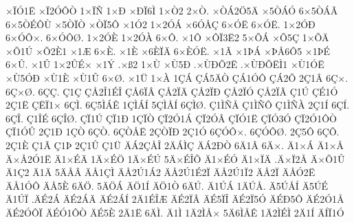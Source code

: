 {^^d7^^cf^^d31^^cb
^^d7^^cf2^^d3^^d4^^d2
1^^d7^^cf^^d1
1^^d7^^d0
^^d7^^d0^^cf6^^cc
1^^d7^^d22
2^^d7^^d2.
^^d7^^d2^^c12^^d65^^c4
^^d75^^d2^^c1^^d3
6^^d75^^d2^^c1^^c3
6^^d75^^d2^^c9^^d4^^d9
^^d75^^d2^^cf^^d2
^^d7^^d2^^cf5^^d4
^^d71^^d32
1^^d72^^d3^^c1
^^d76^^d3^^c5^^c7
6^^d7^^d3^^cb
6^^d7^^d3^^cb.
1^^d72^^d3^^d0
6^^d7^^d3^^d4^^d7.
6^^d7^^d3^^d4^^d8.
1^^d72^^d3^^c8
1^^d72^^d3^^c0
6^^d7^^d4.
^^d71^^d4
^^d7^^d4^^cf3^^cb2
5^^d7^^d5^^c1
^^d7^^d55^^c7
1^^d7^^d5^^c4
^^d7^^d51^^da
^^d7^^d52^^c81
^^d71^^c6
6^^d7^^c8.
^^d71^^c8
^^d76^^c8^^cf^^c4
6^^d7^^c8^^d3^^cb.
^^d71^^c3
^^d71^^de^^c1
^^d7^^de^^c56^^d45
^^d71^^de^^c9
6^^d7^^db.
^^d71^^db
1^^d72^^db^^c9^^d7
^^d71^^dd
.^^d7^^df2
1^^d7^^d9
^^d7^^d95^^d0
.^^d7^^d9^^d0^^d52^^cb
.^^d7^^d9^^d0^^d5^^cb^^cc1
^^d7^^d91^^d3^^cb
^^d7^^d95^^d3^^d0
^^d7^^d91^^c8
^^d7^^d91^^db
6^^d7^^d8.
^^d71^^dc
1^^d7^^c0
1^^c7^^c1
^^c7^^c15^^c4^^d2
^^c7^^c11^^d3^^d4
^^c7^^c12^^d5
2^^c71^^c2
6^^c7^^d7.
6^^c7^^d7^^d8.
6^^c7^^c7.
^^c71^^c7
^^c7^^c52^^ce1^^c9^^ce
^^c7^^c56^^cf^^c2
^^c7^^c52^^cf^^c4
^^c7^^c52^^cf^^d0
^^c7^^c52^^cf^^d3
^^c7^^c52^^cf^^c3
^^c71^^da
^^c7^^c91^^d3
2^^c71^^cb
^^c7^^cb^^cf1^^d7
6^^c7^^cc.
6^^c75^^cc^^c1^^ca
1^^c7^^cc^^c1^^cd
5^^c7^^cc^^c5^^cd
6^^c7^^cc^^d8.
^^c71^^cc^^d1^^c5
^^c71^^cc^^d1^^d4
^^c71^^cc^^d1^^c0
2^^c71^^cd
6^^c7^^cd.
6^^c7^^ce.
^^c71^^ce^^c9
6^^c7^^ce^^d8.
^^c7^^cf1^^da
^^c7^^cf1^^d0
1^^c7^^cf^^d2
^^c7^^cf2^^d31^^c1
^^c7^^cf2^^d3^^c2
^^c7^^cf^^d31^^cb
^^c7^^cf^^d33^^d3
^^c7^^cf2^^d31^^d4^^d2
^^c7^^cf1^^d3^^db
2^^c71^^d0
1^^c7^^d2
6^^c7^^d2.
6^^c7^^d2^^c5^^cb
2^^c7^^d2^^cf^^d0
2^^c71^^d3
6^^c7^^d3^^d4^^d7.
6^^c7^^d3^^d4^^d8.
2^^c75^^d4
6^^c7^^d4.
2^^c71^^c8
^^c71^^c3
^^c71^^de
2^^c71^^db
^^c71^^dc
^^c4^^c12^^c7^^c5^^ce
2^^c4^^c1^^cc^^c7
^^c4^^c12^^d0^^d2
6^^c41^^c2
6^^c4^^d7.
^^c41^^d7^^c1
^^c41^^d7^^c5
^^c4^^d7^^c52^^d31^^cb
^^c41^^d7^^c9^^c4
1^^c4^^d7^^c9^^d6
1^^c4^^d7^^c9^^da
5^^c4^^d7^^c9^^ce^^d5
^^c41^^d7^^c9^^d3
^^c41^^d7^^cf^^c4
.^^c4^^d7^^cf2^^c5
^^c4^^d7^^d51^^db
^^c41^^c72
^^c41^^c4
5^^c4^^c5^^c2
^^c4^^c51^^c7^^cc
^^c4^^c52^^da1^^c12
^^c4^^c52^^da1^^c92^^cf
^^c4^^c52^^da1^^cf2
^^c4^^c52^^cf
^^c4^^c5^^d32^^cb
^^c4^^c51^^d3^^d4
^^c4^^c55^^c8
6^^c4^^d6.
5^^c4^^d6^^c1
^^c4^^d61^^cd
^^c4^^d61^^d2
6^^c4^^da.
^^c41^^da^^c1
1^^c4^^da^^c5.
^^c45^^da^^c5^^cd
^^c45^^da^^c9
^^c41^^da^^cf
.^^c4^^c92^^c1
^^c4^^c92^^c1^^c4
^^c4^^c92^^c1^^cd
2^^c41^^c9^^ce^^c6
^^c4^^c92^^cf^^c2
^^c4^^c95^^cf^^ce
^^c4^^c92^^cf5^^d3
^^c4^^c9^^d05^^d4
^^c4^^c92^^d31^^c5
^^c4^^c92^^d3^^d4^^cf
^^c4^^c9^^d31^^d4^^d2
^^c4^^c95^^c8
2^^c41^^cb
6^^c4^^cc.
^^c41^^cc
1^^c42^^cc^^c5^^d7
5^^c46^^cc^^c5^^ca
1^^c42^^cc^^c9^^cc
2^^c41^^cd
^^c4^^cd^^cf1^^d3
}
